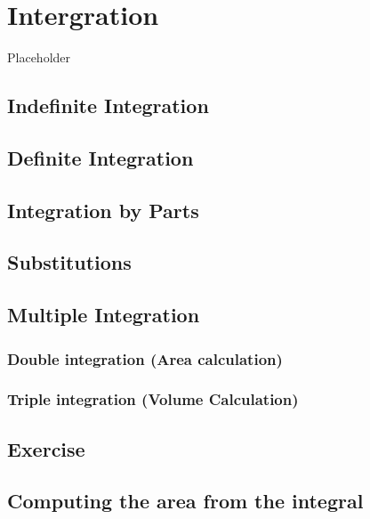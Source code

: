 \documentclass[
]{book}
\theoremstyle{definition}
\theoremstyle{definition}
\theoremstyle{definition}
\theoremstyle{definition}
\theoremstyle{remark}
\begin{document}
\chapter{Intergration}\label{intergration}

Placeholder

\section{Indefinite Integration}\label{indefinite-integration}

\section{Definite Integration}\label{definite-integration}

\section{Integration by Parts}\label{integration-by-parts}

\section{Substitutions}\label{substitutions}

\section{Multiple Integration}\label{multiple-integration}

\subsection{Double integration (Area calculation)}\label{double-integration-area-calculation}

\subsection{Triple integration (Volume Calculation)}\label{triple-integration-volume-calculation}

\section{Exercise}\label{exercise-6}

\section{Computing the area from the integral}\label{computing-the-area-from-the-integral}
\end{document}
